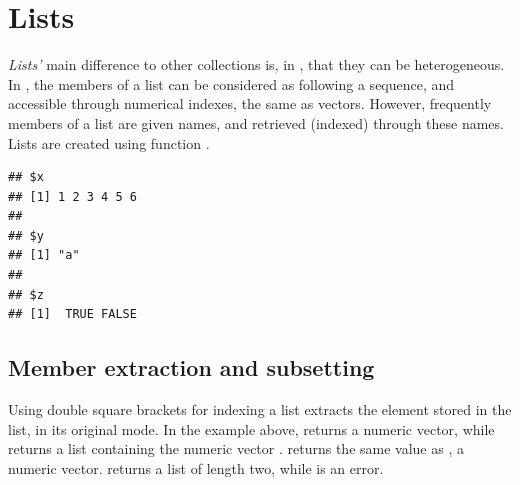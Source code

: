 \documentclass[krantz2]{krantz}\usepackage{knitr}
\begin{document}

\section{Lists}\label{sec:calc:lists}
\emph{Lists'} main difference to other collections is, in \Rlang, that they can be heterogeneous. In \Rlang, the members of a list can be considered as following a sequence, and accessible through numerical indexes, the same as vectors. However, frequently members of a list are given names, and retrieved (indexed) through these names. Lists are created using function .

\begin{knitrout}\footnotesize
{}\color{fgcolor}\begin{kframe}
\begin{alltt}
 \hlkwb{<-} \hlstd{(} \hlstd{=} \hlopt{:}\hlstd{,}  \hlstd{=} \hlstd{,}  \hlstd{=} \hlstd{(}\hlstd{,} \hlstd{))}
\end{alltt}
\begin{verbatim}
## $x
## [1] 1 2 3 4 5 6
##
## $y
## [1] "a"
##
## $z
## [1]  TRUE FALSE
\end{verbatim}
\end{kframe}
\end{knitrout}

\subsection{Member extraction and subsetting}
Using\qRoperator{[[]]} double square brackets for indexing a list extracts the element stored in the list, in its original mode. In the example above,  returns a numeric vector, while  returns a list containing the numeric vector .  returns the same value as , a numeric vector.  returns a list of length two, while  is an error.
\end{document}
